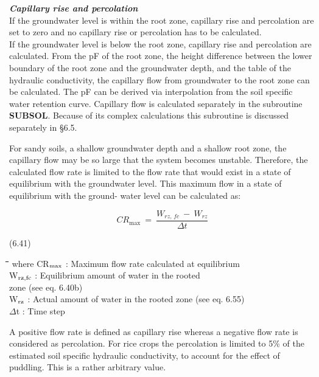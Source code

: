\documentclass[11pt]{article}
\begin{document}
\bigskip
\bigskip
{\bf {\it Capillary rise and percolation\/}}\\
If the groundwater level is within the root zone, capillary rise and percolation are set to
zero and no capillary rise or percolation has to be calculated. \\
If the groundwater level is below the root zone, capillary rise and percolation are
calculated. From the pF of the root zone, the height difference between the lower
boundary of the root zone and the groundwater depth, and the table of the hydraulic
conductivity, the capillary flow from groundwater to the root zone can be calculated. The
pF can be derived via interpolation from the soil specific water retention curve. Capillary
flow is calculated separately in the subroutine {\bf SUBSOL}. Because of its complex calcula\-tions this subroutine is discussed separately in \S 6.5. 

\bigskip
\bigskip
\bigskip
\bigskip
\bigskip
\bigskip
\bigskip
For sandy soils, a shallow groundwater depth and a shallow root zone, the capillary flow
may be so large that the system becomes unstable. Therefore, the calculated flow rate is
limited to the flow rate that would exist in a state of equilibrium with the groundwater
level. This maximum flow in a state of equilibrium with the ground- water level can be
calculated as:

\begin{displaymath}
CR _{\max } ~=~{\frac{ W _{rz,\, fc} ~-~ W _{rz} }{\Delta t}}
\end{displaymath}

 \bigskip
\strut\hfill (6.41)

\nwln
\begin{tabbing}
\hspace{1.27cm}\=\hspace{1.27cm}\=\hspace{1.27cm}\=\hspace{1.27cm}\=%
\hspace{1.27cm}\=\hspace{1.27cm}\=\hspace{1.27cm}\=\hspace{1.27cm}\=%
\hspace{1.27cm}\=\hspace{1.27cm}\=\kill
where\> CR$_{{\rm max}}$\> : Maximum flow rate calculated at equilibrium\> \> \> \> \> \> \> \> [cm d$^{{\rm -1}}$]\\
\>W$_{{\rm rz,fc}}$\> : Equilibrium amount of water in the rooted\\
\>\>   zone (see eq. 6.40b)\> \> \> \> \> \> \> \> [cm]\\
\>W$_{{\rm rz}}$\> : Actual amount of water in the rooted zone (see eq. 6.55)\> \> \> \> \> \> \> \> [cm]\\
\>$\Delta$t\> : Time step\> \> \> \> \> \> \> \> [d]

\end{tabbing}
\bigskip
A positive flow rate is defined as capillary rise whereas a negative flow rate is considered
as percola\-tion. For rice crops the percolation is limited to 5\% of the estimated soil
specific hydraulic conductiv\-ity, to account for the effect of puddling. This is a rather
arbitrary value.
\end{document}
